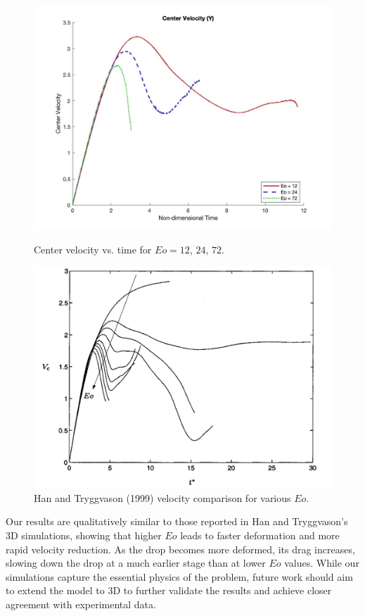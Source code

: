 \documentclass[12pt]{article}
\begin{document}
\begin{figure}[H]
    \centering
    \begin{minipage}{0.45\textwidth}
        \centering
        \includegraphics[width=\textwidth]{figures/velocity_profile_compare.jpg}
        \caption{Center velocity vs. time for $Eo = 12$, $24$, $72$.}
        \label{fig:velocity_comparison}
    \end{minipage}
    \hspace{0.05\textwidth}
    \begin{minipage}{0.45\textwidth}
        \centering
        \includegraphics[width=\textwidth]{figures/Trygg_allEo_velo.jpeg}
        \caption{Han and Tryggvason (1999) velocity comparison for various $Eo$.}
        \label{fig:trygg_comparison}
    \end{minipage}
\end{figure}

Our results are qualitatively similar to those reported in Han and Tryggvason’s 3D simulations, showing that higher $Eo$ leads to faster deformation and more rapid velocity reduction. As the drop becomes more deformed, its drag increases, slowing down the drop at a much earlier stage than at lower $Eo$ values. While our simulations capture the essential physics of the problem, future work should aim to extend the model to 3D to further validate the results and achieve closer agreement with experimental data.




\end{document}
